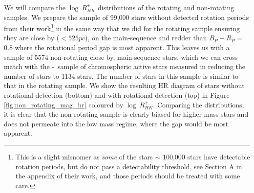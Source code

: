 
We will compare the $\log \ R^{+}_{HK}$ distributions of the \citet{mcquillan_rotation_2014} rotating and non-rotating samples.
We prepare the sample of 99,000 stars without detected rotation periods from their work\footnote{This is a slight misnomer as \textit{some} of the stars $\sim$ 100,000 stars have detectable rotation periods, but do not pass a detectability threshold, see Section A in the appendix of their work, and those periods should be treated with some care.} in the same way that we did for the rotating sample ensuring they are close by ($<525 pc$), on the main-sequence and redder than $B_P-R_P$ = 0.8 where the rotational period gap is most apparent.
This leaves us with a sample of 5574 non-rotating close by, main-sequence stars, which we can cross match with the \kepler-\lamost\ sample of chromospheric active stars measured in \citet{zhang_magnetic_2020} reducing the number of stars to 1134 stars.
The number of stars in this sample is similar to that in the rotating sample.
We show the resulting HR diagram of stars without rotational detection (bottom) and with rotational detection (top) in Figure \ref{fig:non_rotating_mag_hr} coloured by $\log \ R^{+}_{HK}$.
Comparing the distributions, it is clear that the non-rotating sample is clearly biased for higher mass stars and does not permeate into the low mass regime, where the gap would be most apparent.

